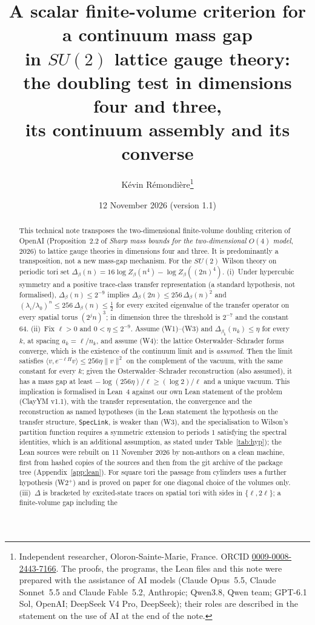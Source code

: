 \documentclass[11pt,a4paper]{article}
\title{A scalar finite-volume criterion for a continuum mass gap\\ in $SU(2)$ lattice gauge theory:\\ the doubling test in dimensions four and three,\\ its continuum assembly and its converse}
\author{K\'evin R\'emondi\`ere\thanks{Independent researcher, Oloron-Sainte-Marie, France. ORCID
\href{https://orcid.org/0009-0008-2443-7166}{0009-0008-2443-7166}. The proofs, the programs, the Lean files and this note were
prepared with the assistance of AI models (Claude Opus~5.5, Claude Sonnet~5.5 and Claude Fable~5.2, Anthropic; Qwen3.8, Qwen team; GPT-6.1 Sol, OpenAI; DeepSeek V4 Pro, DeepSeek); their roles are described in the
statement on the use of AI at the end of the note.}}
\date{12 November 2026 (version 1.1)}
\theoremstyle{plain}
\theoremstyle{definition}
\theoremstyle{remark}
\numberwithin{equation}{section}
\begin{document}
\maketitle

\begin{abstract}
This technical note transposes the two-dimensional finite-volume doubling criterion of OpenAI (Proposition~2.2 of \emph{Sharp mass bounds
for the two-dimensional $O(4)$ model}, 2026) to lattice gauge theories in dimensions four and three. It is predominantly a transposition,
not a new mass-gap mechanism. For the $SU(2)$ Wilson theory on periodic tori set
$\Delta_\beta(n)=16\log Z_\beta(n^4)-\log Z_\beta((2n)^4)$.
(i)~Under hypercubic symmetry and a positive trace-class transfer representation (a standard hypothesis, not formalised),
$\Delta_\beta(n)\le2^{-9}$ implies $\Delta_\beta(2n)\le256\,\Delta_\beta(n)^2$ and
$(\lambda_i/\lambda_0)^n\le256\,\Delta_\beta(n)\le\frac12$ for every excited eigenvalue of the transfer operator on every spatial torus
$(2^jn)^3$; in dimension three the threshold is $2^{-7}$ and the constant $64$.
(ii)~Fix $\ell>0$ and $0<\eta\le2^{-9}$. Assume (W1)--(W3) and $\Delta_{\beta_k}(n_k)\le\eta$ for every $k$, at spacing $a_k=\ell/n_k$, and assume (W4): the lattice
Osterwalder--Schrader forms converge, which is the existence of the continuum limit and is \emph{assumed}. Then the limit satisfies
$\langle v,e^{-\ell H}v\rangle\le256\eta\|v\|^2$ on the complement of the vacuum, with the same constant for every $k$; given the
Osterwalder--Schrader reconstruction (also assumed), it has a mass gap at least $-\log(256\eta)/\ell\ge(\log2)/\ell$ and a unique vacuum.
This implication is formalised in Lean~4 against our own Lean statement of the problem (ClayYM v1.1), with the transfer representation, the
convergence and the reconstruction as named hypotheses (in the Lean statement the hypothesis on the transfer structure, \texttt{SpecLink}, is weaker than (W3), and the specialisation to Wilson's partition function requires a symmetric extension to periods $1$ satisfying the spectral identities, which is an additional assumption, as stated under Table~\ref{tab:hyp}); the Lean sources were rebuilt on 11 November 2026 by non-authors on a clean
machine, first from hashed copies of the sources and then from the git archive of the package tree (Appendix~\ref{app:lean}). For square tori the passage from cylinders uses a further hypothesis (W2$^+$) and is proved on paper for one
diagonal choice of the volumes only.
(iii)~$\Delta$ is bracketed by excited-state traces on spatial tori with sides in $\{\ell,2\ell\}$; a finite-volume gap including the

\end{abstract}
\end{document}

